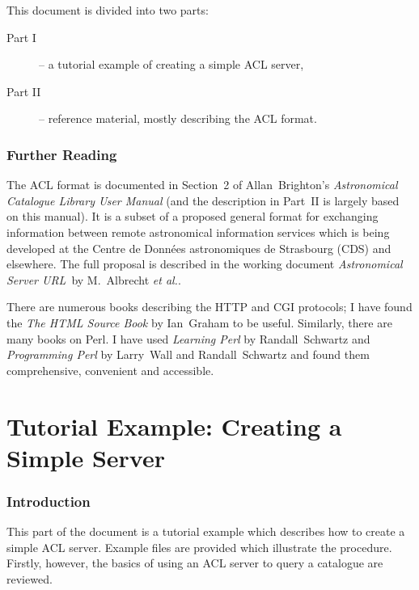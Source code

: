 \documentclass[twoside,11pt,nolof,chapters]{starlink}
\begin{document}
This document is divided into two parts:

\begin{description}

  \item[{\rm Part I}] -- a tutorial example of creating a simple ACL
   server,

  \item[{\rm Part II}] -- reference material, mostly describing the
   ACL format.

\end{description}


\section{\label{FURTHER}Further Reading}

The ACL format is documented in Section~2 of Allan~Brighton's \textit{Astronomical Catalogue Library User Manual}\/\cite{BRIGHTON98} (and the
description in Part~II is largely based on this manual).  It is a
subset of a proposed general format for exchanging information between
remote astronomical information services which is being developed at the
Centre de Donn\'{e}es astronomiques de Strasbourg (CDS) and elsewhere.
The full proposal is described in the working document \textit{Astronomical
Server URL}\, by M.~Albrecht \textit{et al.}\cite{SERVERURL}.

There are numerous books describing the HTTP and CGI protocols; I
have found the \textit{The HTML Source Book}\/ by Ian~Graham\cite{GRAHAM95}
to be useful.  Similarly, there are many books on Perl.  I have used
\textit{Learning Perl}\/ by  Randall~Schwartz\cite{SCHWARTZ93} and \textit{Programming Perl}\/ by Larry~Wall and Randall~Schwartz\cite{WALL91} and
found them comprehensive, convenient and accessible.

\cleardoublepage

\part{Tutorial Example: Creating a Simple Server}

\section{\label{INTRO_T}Introduction}

This part of the document is a tutorial example which describes how to
create a simple ACL server.  Example files are provided which illustrate
the procedure.  Firstly, however, the basics of using an ACL server to
query a catalogue are reviewed.
\end{document}

